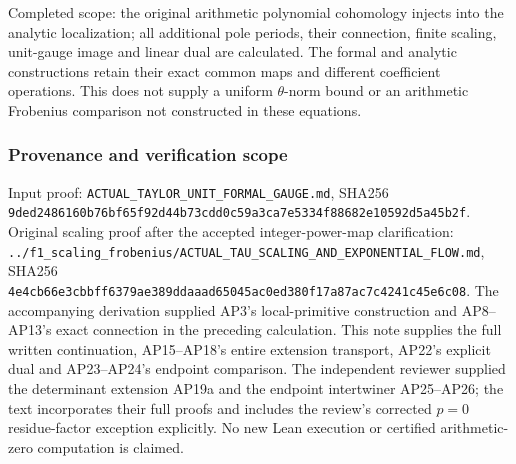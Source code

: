 \documentclass{article}
\begin{document}
Completed scope: the original arithmetic polynomial cohomology injects into the analytic localization; all additional pole periods, their connection, finite scaling, unit-gauge image and linear dual are calculated. The formal and analytic constructions retain their exact common maps and different coefficient operations. This does not supply a uniform \(\theta\)-norm bound or an arithmetic Frobenius comparison not constructed in these equations.

\subsubsection{Provenance and verification scope}\label{endpoint-analytic_pole--provenance-and-verification-scope}

Input proof: \nolinkurl{ACTUAL_TAYLOR_UNIT_FORMAL_GAUGE.md}, SHA256 \nolinkurl{9ded2486160b76bf65f92d44b73cdd0c59a3ca7e5334f88682e10592d5a45b2f}. Original scaling proof after the accepted integer-power-map clarification: \nolinkurl{../f1_scaling_frobenius/ACTUAL_TAU_SCALING_AND_EXPONENTIAL_FLOW.md}, SHA256 \nolinkurl{4e4cb66e3cbbff6379ae389ddaaad65045ac0ed380f17a87ac7c4241c45e6c08}. The accompanying derivation supplied AP3's local-primitive construction and AP8--AP13's exact connection in the preceding calculation. This note supplies the full written continuation, AP15--AP18's entire extension transport, AP22's explicit dual and AP23--AP24's endpoint comparison. The independent reviewer supplied the determinant extension AP19a and the endpoint intertwiner AP25--AP26; the text incorporates their full proofs and includes the review's corrected \(p=0\) residue-factor exception explicitly. No new Lean execution or certified arithmetic-zero computation is claimed.

\endgroup
\end{document}
